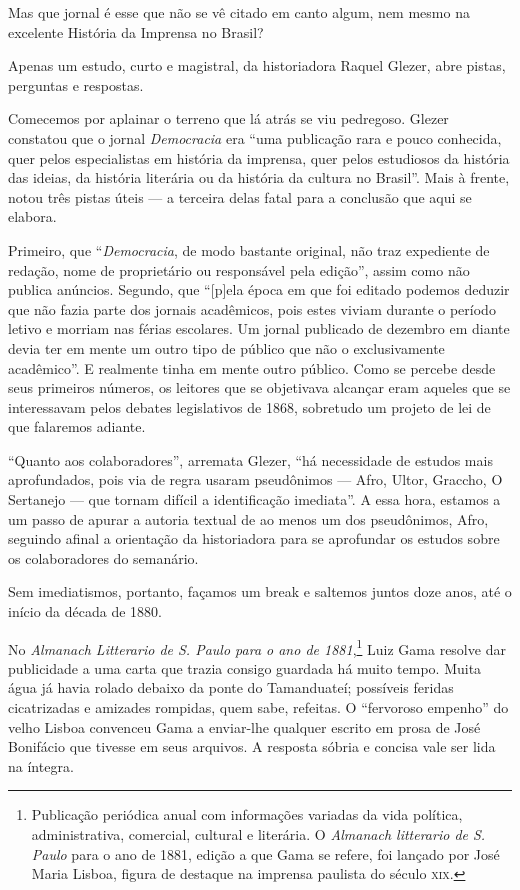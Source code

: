 Mas que jornal é esse que não se vê citado em canto algum, nem mesmo na
excelente História da Imprensa no Brasil?

Apenas um estudo, curto e magistral, da historiadora Raquel Glezer, abre
pistas, perguntas e respostas.

Comecemos por aplainar o terreno que lá atrás se viu pedregoso. Glezer
constatou que o jornal \emph{Democracia} era ``uma publicação rara e
pouco conhecida, quer pelos especialistas em história da imprensa, quer
pelos estudiosos da história das ideias, da história literária ou da
história da cultura no Brasil''. Mais à frente, notou três pistas úteis
--- a terceira delas fatal para a conclusão que aqui se elabora.

Primeiro, que ``\emph{Democracia}, de modo bastante original, não traz
expediente de redação, nome de proprietário ou responsável pela edição'',
assim como não publica anúncios. Segundo, que ``{[}p{]}ela época em que
foi editado podemos deduzir que não fazia parte dos jornais acadêmicos,
pois estes viviam durante o período letivo e morriam nas férias
escolares. Um jornal publicado de dezembro em diante devia ter em mente
um outro tipo de público que não o exclusivamente acadêmico''. E
realmente tinha em mente outro público. Como se percebe desde seus
primeiros números, os leitores que se objetivava alcançar eram aqueles
que se interessavam pelos debates legislativos de 1868, sobretudo um
projeto de lei de que falaremos adiante.

``Quanto aos colaboradores'', arremata Glezer, ``há necessidade de estudos
mais aprofundados, pois via de regra usaram pseudônimos --- Afro, Ultor,
Graccho, O Sertanejo --- que tornam difícil a identificação imediata''. A
essa hora, estamos a um passo de apurar a autoria textual de ao menos um
dos pseudônimos, Afro, seguindo afinal a orientação da historiadora para
se aprofundar os estudos sobre os colaboradores do semanário.

Sem imediatismos, portanto, façamos um break e saltemos juntos doze
anos, até o início da década de 1880.

No \emph{Almanach Litterario de S. Paulo para o ano de 1881},\footnote{Publicação periódica anual com informações variadas da vida política,
  administrativa, comercial, cultural e literária. O \emph{Almanach
  litterario de S. Paulo} para o ano de 1881, edição a que Gama se
  refere, foi lançado por José Maria Lisboa, figura de destaque na
  imprensa paulista do século \textsc{xix}.} Luiz Gama resolve dar publicidade a
uma carta que trazia consigo guardada há muito tempo. Muita água já
havia rolado debaixo da ponte do Tamanduateí; possíveis feridas
cicatrizadas e amizades rompidas, quem sabe, refeitas. O ``fervoroso
empenho'' do velho Lisboa convenceu Gama a enviar-lhe qualquer escrito em
prosa de José Bonifácio que tivesse em seus arquivos. A resposta sóbria
e concisa vale ser lida na íntegra.

